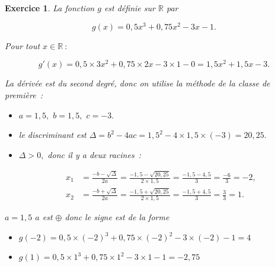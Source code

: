 \documentclass[10pt]{article}
\newtheorem{exo}{Exercice}
\begin{document}
\begin{exo}

La fonction $g$ est définie sur $\mathbb{R}$ par 

\[g(x)=0,5x^3+0,75x^2-3x-1.\]

\medskip

Pour tout $x\in\mathbb{R}~:$

\[g'(x)=0,5\times 3x^2+0,75\times 2x-3\times 1-0=1,5x^2+1,5x-3.\]

La dérivée est du second degré, donc on utilise la méthode de la classe de première~:

\begin{itemize}
\item[\textbullet] $a=1,5,$ $b=1,5,$ $c=-3.$
\item[\textbullet] le discriminant est $\Delta=b^2-4ac=1,5^2-4\times 1,5\times (-3)=20,25.$
\item[\textbullet] $\Delta>0,$ donc il y a deux racines~:

\begin{align*}x_1&=\frac{-b-\sqrt{\Delta}}{2a}=\frac{-1,5-\sqrt{20,25}}{2\times 1,5}=\frac{-1,5-4,5}{3}=\frac{-6}{3}=-2,\\
x_2&=\frac{-b+\sqrt{\Delta}}{2a}=\frac{-1,5+\sqrt{20,25}}{2\times 1,5}=\frac{-1,5+4,5}{3}=\frac{3}{3}=1.
\end{align*}
\end{itemize}

\medskip

$a=1,5$  $a$ est $\oplus$ donc le signe est de la forme \fbox{$+~\upphi~-~\upphi~+$}

\medskip

\setlength{\columnseprule}{1pt}

\begin{multicols}{2}
\begin{center}
\end{center}

\columnbreak

\begin{itemize}
\item[\textbullet] $g(-2)=0,5\times(-2)^3+0,75\times (-2)^2-3\times (-2)-1=4$
\item[\textbullet] $g(1)=0,5\times 1^3+0,75\times 1^2-3\times 1-1=-2,75$
\end{itemize}



\end{multicols}
\end{exo}
\end{document}
